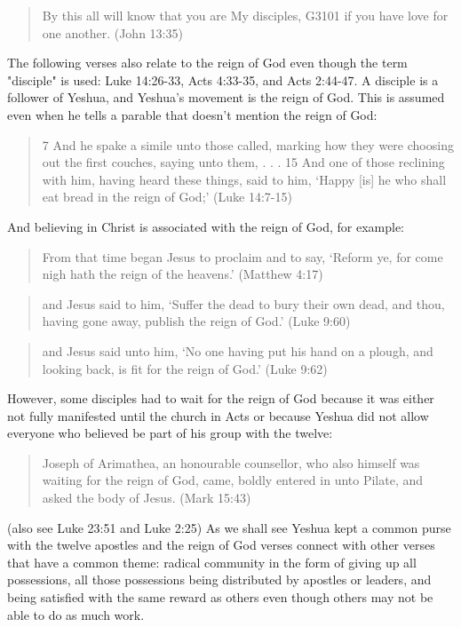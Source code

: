 \documentclass[11pt]{article}
\begin{document}
\begin{quote}
By this all will know that you are My disciples, G3101 if you have love for one another.
(John 13:35)
\end{quote}
The following verses also relate to the reign of God even though the term "disciple" is used: Luke 14:26-33, Acts 4:33-35, and Acts 2:44-47. A disciple is a follower of Yeshua, and Yeshua's movement is the reign of God. This is assumed even when he tells a parable that doesn't mention the reign of God:
\begin{quote}
7 And he spake a simile unto those called, marking how they were choosing out the first couches, saying unto them, . . . 
15 And one of those reclining with him, having heard these things, said to him, `Happy [is] he who shall eat bread in the reign of God;' (Luke 14:7-15)
\end{quote}
And believing in Christ is associated with the reign of God,\cite{reign of god} for example:
\begin{quote}
From that time began Jesus to proclaim and to say, `Reform ye, for come nigh hath the reign of the heavens.' (Matthew 4:17)
\end{quote}
\begin{quote}
and Jesus said to him, `Suffer the dead to bury their own dead, and thou, having gone away, publish the reign of God.' (Luke 9:60)
\end{quote}
\begin{quote}
and Jesus said unto him, `No one having put his hand on a plough, and looking back, is fit for the reign of God.' (Luke 9:62)
\end{quote}
However, some disciples had to wait for the reign of God because it was either not fully manifested until the church in Acts or because Yeshua did not allow everyone who believed be part of his group with the twelve:
\begin{quote}
Joseph of Arimathea, an honourable counsellor, who also himself was waiting for the reign of God, came, boldly entered in unto Pilate, and asked the body of Jesus. (Mark 15:43)
\end{quote}
(also see Luke 23:51 and Luke 2:25) As we shall see Yeshua kept a common purse with the twelve apostles and the reign of God verses connect with other verses that have a common theme: radical community in the form of giving up all possessions, all those possessions being distributed by apostles or leaders, and being satisfied with the same reward as others even though others may not be able to do as much work.
\end{document}
